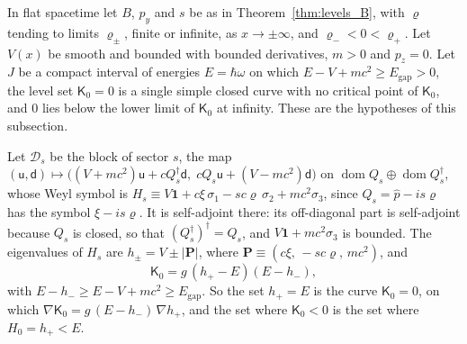 \documentclass[aps,prd,onecolumn,tightenlines,nofootinbib,notitlepage,11pt,floatfix]{revtex4-2}
\theoremstyle{indentedtheorem}
\begin{document}
In flat spacetime let $B$, $p_y$ and $s$ be as in Theorem~\ref{thm:levels_B}, with $\varrho$ tending to limits $\varrho_\pm$, finite or infinite, as $x\to\pm\infty$, and $\varrho_-<0<\varrho_+$. Let $V(x)$ be smooth and bounded with bounded derivatives, $m>0$ and $p_z=0$. Let $J$ be a compact interval of energies $E=\hbar\omega$ on which $E-V+mc^2\geq E_\text{gap}>0$, the level set $\mathsf{K}_0=0$ is a single simple closed curve with no critical point of $\mathsf{K}_0$, and $0$ lies below the lower limit of $\mathsf{K}_0$ at infinity. These are the hypotheses of this subsection.

Let $\mathcal{D}_s$ be the block of sector $s$, the map $(\mathsf{u},\mathsf{d})\mapsto\big((V+mc^2)\mathsf{u}+cQ_s^\dagger\mathsf{d},\;cQ_s\mathsf{u}+(V-mc^2)\mathsf{d}\big)$ on $\operatorname{dom}Q_s\oplus\operatorname{dom}Q_s^\dagger$, whose Weyl symbol is $H_s\equiv V\mathbf{1}+c\xi\,\sigma_1-sc\varrho\,\sigma_2+mc^2\sigma_3$, since $Q_s=\hat{p}-is\varrho$ has the symbol $\xi-is\varrho$. It is self-adjoint there: its off-diagonal part is self-adjoint because $Q_s$ is closed, so that $(Q_s^\dagger)^\dagger=Q_s$, and $V\mathbf{1}+mc^2\sigma_3$ is bounded. The eigenvalues of $H_s$ are $h_\pm=V\pm|\mathbf{P}|$, where $\mathbf{P}\equiv(c\xi,\,-sc\varrho,\,mc^2)$, and
\begin{equation*}
    \mathsf{K}_0 = g\,(h_+-E)(E-h_-) ,
\end{equation*}
with $E-h_-\geq E-V+mc^2\geq E_\text{gap}$. So the set $h_+=E$ is the curve $\mathsf{K}_0=0$, on which $\nabla\mathsf{K}_0=g\,(E-h_-)\,\nabla h_+$, and the set where $\mathsf{K}_0<0$ is the set where $H_0=h_+<E$.
\end{document}
